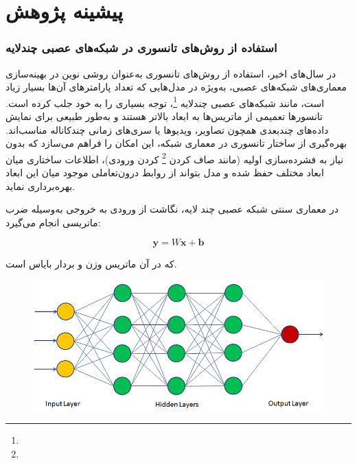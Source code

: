 \chapter{پیشینه پژوهش}



\subsection*{استفاده از روش‌های تانسوری در شبکه‌های عصبی چندلایه}

در سال‌های اخیر، استفاده از روش‌های تانسوری به‌عنوان روشی نوین در بهینه‌سازی معماری‌های شبکه‌های عصبی، به‌ویژه در مدل‌هایی که تعداد پارامترهای آن‌ها بسیار زیاد است، مانند شبکه‌های عصبی چندلایه \footnote{}، توجه بسیاری را به خود جلب کرده است. تانسورها تعمیمی از ماتریس‌ها به ابعاد بالاتر هستند و به‌طور طبیعی برای نمایش داده‌های چندبعدی همچون تصاویر، ویدیوها یا سری‌های زمانی چندکاناله مناسب‌اند. بهره‌گیری از ساختار تانسوری در معماری شبکه، این امکان را فراهم می‌سازد که بدون نیاز به فشرده‌سازی اولیه (مانند صاف کردن \footnote{} کردن ورودی)، اطلاعات ساختاری میان ابعاد مختلف حفظ شده و مدل بتواند از روابط درون‌تعاملی موجود میان این ابعاد بهره‌برداری نماید.

در معماری سنتی شبکه عصبی چند لایه، نگاشت از ورودی  به خروجی  به‌وسیله ضرب ماتریسی انجام می‌گیرد:

\[
\mathbf{y} = W\mathbf{x} + \mathbf{b}
\]

که در آن  ماتریس وزن و  بردار بایاس است. 




\begin{figure}[h]
	\centering
	\begin{minipage}[b]{0.8\textwidth}
		\centering
		\includegraphics[width=\textwidth]{transformer_images/mlp.png}
		\caption{}
		\label{fig:Mlp}
	\end{minipage}
	\hfill
\end{figure}





